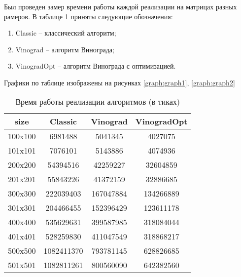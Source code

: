 \documentclass[utf8x, 12pt]{G7-32}
\begin{document}
Был проведен замер времени работы каждой реализации на матрицах разных рамеров.
В таблице \ref{table:time} приняты следующие обозначения:\begin{enumerate}
            \item Classic -- классический алгоритм;
            \item Vinograd -- алгоритм Винограда;
            \item VinogradOpt -- алгоритм Винограда с оптимизацией.
        \end{enumerate}

Графики по таблице изображены на рисунках \ref{graph:graph1}, \ref{graph:graph2}

\begin{table} [h!]
\caption{Время работы реализации алгоритмов  (в тиках)}
	\centering
	\begin{tabular}{|c c c c|} 
 	\hline
	size & Classic & Vinograd & VinogradOpt \\ [0.8ex] 
 	\hline\hline
 	100x100 & 6981488 & 5041345 & 4027075\\
 	\hline
 	101x101 & 7076101 & 5143886 & 4074936\\
 	\hline
 	200x200 & 54394516 & 42259227 & 32604859\\
 	\hline
 	201x201 & 55843226 & 41372159 & 32886685\\
 	\hline
	300x300 & 222039403 & 167047884 & 134266889\\
	\hline
	301x301 & 204466455 & 152396429 & 123611178\\
	\hline
	400x400 & 535629631 & 399587985 & 318084044\\
	\hline
	401x401 & 528259830 & 411047549 & 318868217\\
	\hline
	500x500 & 1082411370 & 793781145 & 628826685\\
	\hline
	501x501 & 1082811261 & 800560090 & 642382560\\
	\hline
	\end{tabular}
	\label{table:time}
\end{table}
\end{document}
